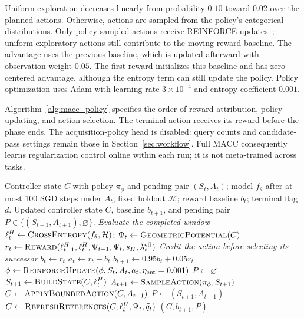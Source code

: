 \documentclass[10pt,a4paper,twocolumn]{article}
\begin{document}
Uniform exploration decreases linearly from probability $0.10$ toward
$0.02$ over the planned actions. Otherwise, actions are sampled from
the policy's categorical distributions. Only policy-sampled actions
receive REINFORCE updates~\cite{williams1992}; uniform exploratory
actions still contribute to the moving reward baseline. The advantage
uses the previous baseline, which is updated afterward with observation
weight $0.05$. The first reward initializes this baseline and has zero
centered advantage, although the entropy term can still update the
policy. Policy optimization uses Adam with learning rate
$3\times10^{-4}$ and entropy coefficient $0.001$.

Algorithm~\ref{alg:macc_policy} specifies the order of reward attribution,
policy updating, and action selection. The terminal action receives its
reward before the phase ends. The acquisition-policy head is disabled:
query counts and candidate-pass settings remain those in
Section~\ref{sec:workflow}. Full MACC consequently learns regularization
control online within each run; it is not meta-trained across tasks.

\begin{algorithm*}[tbp]
\small

\caption{\textbf{Full-MACC update at the end of a control window}}
\label{alg:macc_policy}
\begin{algorithmic}[1]
\Require Controller state $C$ with policy $\pi_\phi$ and pending pair $(S_t,A_t)$;
model $f_\theta$ after at most 100 SGD steps under $A_t$;
fixed holdout $\mathcal H$; reward baseline $b_t$; terminal flag $d$.
\Ensure Updated controller state $C$, baseline $b_{t+1}$, and pending pair
$P\in\{(S_{t+1},A_{t+1}),\varnothing\}$.
\Statex \textit{Evaluate the completed window}
\State $\ell_t^H\gets\Call{CrossEntropy}{f_\theta,\mathcal H}$;
       $\Psi_t\gets\Call{GeometricPotential}{C}$
\State $r_t\gets\Call{Reward}{\ell_{t-1}^H,\ell_t^H,\Psi_{t-1},\Psi_t,s_H,
       \lambda_t^{\mathrm{eff}}}$ 
\Statex \textit{Credit the action before selecting its successor}
    \State $b_t\gets r_t$ 
\EndIf
\State $a_t\gets r_t-b_t$
\State $b_{t+1}\gets0.95b_t+0.05r_t$
    \State $\phi\gets\Call{ReinforceUpdate}{\phi,S_t,A_t,a_t,\eta_{\mathrm{ent}}=0.001}$
\EndIf
\State $P\gets\varnothing$ 
    \State $S_{t+1}\gets\Call{BuildState}{C,\ell_t^H}$
    \State $A_{t+1}\gets\Call{SampleAction}{\pi_\phi,S_{t+1}}$
    \State $C\gets\Call{ApplyBoundedAction}{C,A_{t+1}}$
    \State $P\gets(S_{t+1},A_{t+1})$
\EndIf
\State $C\gets\Call{RefreshReferences}{C,\ell_t^H,\Psi_t,\widehat q_t}$
\State \Return $(C,b_{t+1},P)$ 
\end{algorithmic}
\end{algorithm*}
\end{document}
